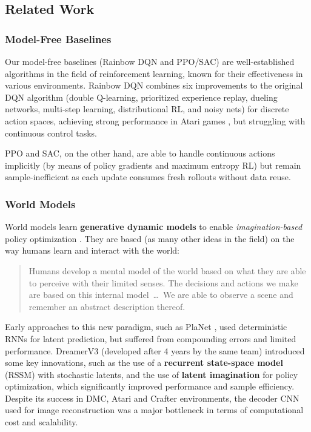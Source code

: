\documentclass{article}
\begin{document}
\subsection{Related Work}

\subsubsection{Model-Free Baselines}

Our model-free baselines (Rainbow DQN and PPO/SAC) are well-established algorithms in the field of reinforcement learning, known for their effectiveness in various environments. Rainbow DQN combines six improvements to the original DQN algorithm (double Q-learning, prioritized experience replay, dueling networks, multi-step learning, distributional RL, and noisy nets)  for discrete action spaces, achieving strong performance in Atari games \cite{rainbow2018combining}, but struggling with continuous control tasks.

PPO and SAC, on the other hand, are able to handle continuous actions implicitly (by means of policy gradients and maximum entropy RL) but remain sample-inefficient as each update consumes fresh rollouts without data reuse.

\subsubsection{World Models}

World models learn \textbf{generative dynamic models} to enable \textit{imagination-based} policy optimization \cite{ha2018world}. They are based (as many other ideas in the field) on the way humans learn and interact with the world:

\begin{quote}
    Humans develop a mental model of the world based on what they are able to perceive with their limited senses. The decisions and actions we make are based on this internal model \,\dots\, We are able to observe a scene and remember an abstract description thereof.
\end{quote}

Early approaches to this new paradigm, such as PlaNet \cite{hafner2019planet}, used deterministic RNNs for latent prediction, but suffered from compounding errors and limited performance. DreamerV3 \cite{hafner2023mastering} (developed after 4 years by the same team) introduced some key innovations, such as the use of a \textbf{recurrent state-space model} (RSSM) with stochastic latents, and the use of \textbf{latent imagination} for policy optimization, which significantly improved performance and sample efficiency. Despite its success in DMC, Atari and Crafter environments, the decoder CNN used for image reconstruction was a major bottleneck in terms of computational cost and scalability.
\end{document}
